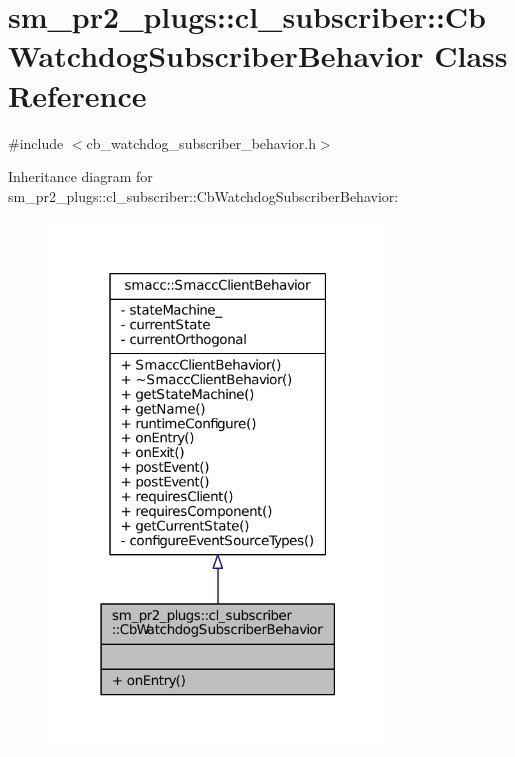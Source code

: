 \hypertarget{classsm__pr2__plugs_1_1cl__subscriber_1_1CbWatchdogSubscriberBehavior}{}\section{sm\+\_\+pr2\+\_\+plugs\+:\+:cl\+\_\+subscriber\+:\+:Cb\+Watchdog\+Subscriber\+Behavior Class Reference}
\label{classsm__pr2__plugs_1_1cl__subscriber_1_1CbWatchdogSubscriberBehavior}


{\ttfamily \#include $<$cb\+\_\+watchdog\+\_\+subscriber\+\_\+behavior.\+h$>$}



Inheritance diagram for sm\+\_\+pr2\+\_\+plugs\+:\+:cl\+\_\+subscriber\+:\+:Cb\+Watchdog\+Subscriber\+Behavior\+:
\nopagebreak
\begin{figure}[H]
\begin{center}
\leavevmode
\includegraphics[width=255pt]{classsm__pr2__plugs_1_1cl__subscriber_1_1CbWatchdogSubscriberBehavior__inherit__graph}
\end{center}
\end{figure}


